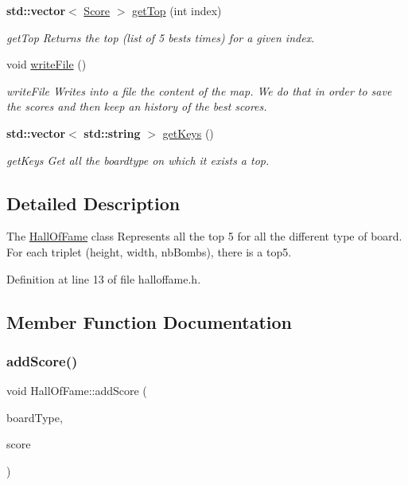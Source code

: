 \begin{DoxyCompactItemize}
\textbf{ std\+::vector}$<$ \hyperlink{class_score}{Score} $>$ \hyperlink{class_hall_of_fame_ade9732fe195179e6ff7a7adecf2f4528}{get\+Top} (int index)
\begin{DoxyCompactList}\small\item\em get\+Top Returns the top (list of 5 bests times) for a given index. \end{DoxyCompactList}\item 
\mbox{\label{class_hall_of_fame_a84804f031deb3f4ef290bce0c6f84db9}} 
void \hyperlink{class_hall_of_fame_a84804f031deb3f4ef290bce0c6f84db9}{write\+File} ()
\begin{DoxyCompactList}\small\item\em write\+File Writes into a file the content of the map. We do that in order to save the scores and then keep an history of the best scores. \end{DoxyCompactList}\item 
\textbf{ std\+::vector}$<$ \textbf{ std\+::string} $>$ \hyperlink{class_hall_of_fame_aa784fe5d8ace8fb5b2344a06bfb5fb84}{get\+Keys} ()
\begin{DoxyCompactList}\small\item\em get\+Keys Get all the boardtype on which it exists a top. \end{DoxyCompactList}\end{DoxyCompactItemize}


\subsection{Detailed Description}
The \hyperlink{class_hall_of_fame}{Hall\+Of\+Fame} class Represents all the top 5 for all the different type of board. For each triplet (height, width, nb\+Bombs), there is a top5. 

Definition at line 13 of file halloffame.\+h.



\subsection{Member Function Documentation}
\mbox{\label{class_hall_of_fame_af27ed4518905f0a948112a05268ffd73}} 
\subsubsection{\texorpdfstring{add\+Score()}{addScore()}}
{\footnotesize\ttfamily void Hall\+Of\+Fame\+::add\+Score (\begin{DoxyParamCaption}\item[{const \hyperlink{struct_board_type}{Board\+Type} \&}]{board\+Type,  }\item[{const \hyperlink{class_score}{Score} \&}]{score }\end{DoxyParamCaption})}



